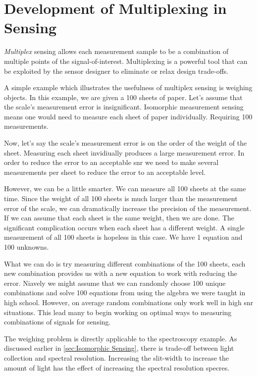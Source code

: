 \section{Development of Multiplexing in Sensing}

\emph{Multiplex} sensing allows each measurement sample to be a combination of multiple points of the signal-of-interest. Multiplexing is a powerful tool that can be exploited by the sensor designer to eliminate or relax design trade-offs. 

A simple example which illustrates the usefulness of multiplex sensing is weighing objects. In this example, we are given a 100 sheets of paper. Let's assume that the scale's measurement error is insignificant. Isomorphic measurement sensing means one would need to measure each sheet of paper individually. Requiring 100 measurements. 

Now, let's say the scale's measurement error is on the order of the weight of the sheet. Measuring each sheet invidiually produces a large measurement error. In order to reduce the error to an acceptable \gls{snr} we need to make several measurements per sheet to reduce the error to an acceptable level.

However, we can be a little smarter. We can measure all 100 sheets at the same time. Since the weight of all 100 sheets is much larger than the measurement error of the scale, we can dramatically increase the precision of the measurement. If we can assume that each sheet is the same weight, then we are done. The significant complication occurs when each sheet has a different weight. A single measurement of all 100 sheets is hopeless in this case. We have 1 equation and 100 unknowns. 

What we can do is try measuring different combinations of the 100 sheets, each new combination provides us with a new equation to work with reducing the error. Niavely we might assume that we can randomly choose 100 unique combinations and solve 100 equations from using the algebra we were taught in high school. However, on average random combinations only work well in high \gls{snr} situations. This lead many to begin working on optimal ways to measuring combinations of signals for sensing. 

The weighing problem is directly applicable to the spectroscopy example. As discussed earlier in \autoref{sec:Isomorphic Sensing}, there is trade-off between light collection and spectral resolution. Increasing the slit-width to increase the amount of light has the effect of increasing the spectral resolution \gls{specres}. 

